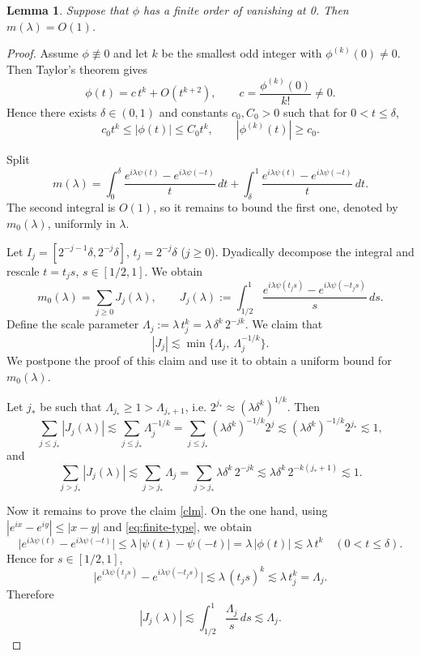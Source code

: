 \documentclass[11pt]{amsart}
\newtheorem{lemma}[theorem]{Lemma}
\newcommand{\la}{\lambda}
\newcommand{\ls}{\lesssim}
\newcommand{\1}{{\rm 1\hspace*{-0.4ex}%
			\rule{0.1ex}{1.52ex}\hspace*{0.2ex}}}
\numberwithin{equation}{section}
\begin{document}
\begin{lemma}\label{finitetype}
	Suppose that $\phi$ has a finite order of vanishing at 0. Then $m(\la)=O(1)$.
\end{lemma}
\begin{proof}
	Assume $\phi\not\equiv 0$ and let $k$ be the smallest odd integer with $\phi^{(k)}(0)\neq 0$.
	Then Taylor's theorem gives
	\[
	\phi(t)=c\,t^k+O(t^{k+2}),\qquad c=\frac{\phi^{(k)}(0)}{k!}\neq 0.
	\]
	Hence there exists $\delta\in(0,1)$ and constants $c_0,C_0>0$ such that for $0<t\le\delta$,
	\begin{equation}\label{eq:finite-type}
		c_0 t^k\le |\phi(t)|\le C_0 t^k,
		\qquad
		|\phi^{(k)}(t)|\ge c_0.
	\end{equation}
	
	Split
	\[
	m(\lambda)=\int_0^\delta \frac{e^{i\lambda\psi(t)}-e^{i\lambda\psi(-t)}}{t}\,dt
	+\int_\delta^1 \frac{e^{i\lambda\psi(t)}-e^{i\lambda\psi(-t)}}{t}\,dt.
	\]
	The second integral is $O(1)$, so it remains to bound the first one, denoted by $m_0(\la)$, uniformly in $\lambda$.
	
	Let $I_j=[2^{-j-1}\delta,2^{-j}\delta]$, $t_j=2^{-j}\delta$ ($j\ge 0$). Dyadically decompose the integral and
	rescale $t=t_js$, $s\in[1/2,1]$. We obtain
	\[
	m_0(\lambda)=\sum_{j\ge 0} J_j(\lambda),
	\qquad
	J_j(\lambda):=\int_{1/2}^1 \frac{e^{i\lambda\psi(t_js)}-e^{i\lambda\psi(-t_js)}}{s}\,ds.
	\]
	Define the scale parameter $\Lambda_j:=\lambda\,t_j^k=\lambda\,\delta^k\,2^{-jk}.$
We claim that \begin{equation}\label{clm}
	|J_j|\ls \min \{\Lambda_j,\ \Lambda_j^{-1/k}\}.
\end{equation} We postpone the proof of this claim and use it to obtain a uniform bound for $m_0(\lambda)$.

 Let $j_*$ be such that $\Lambda_{j_*}\ge 1>\Lambda_{j_*+1}$, i.e.
$2^{j_*}\approx (\lambda\delta^k)^{1/k}$. Then 
\[
\sum_{j\le j_*}|J_j(\lambda)|
\lesssim \sum_{j\le j_*}\Lambda_j^{-1/k}
=\sum_{j\le j_*}(\lambda\delta^k)^{-1/k}2^{j}
\lesssim (\lambda\delta^k)^{-1/k}2^{j_*}
\lesssim 1,
\]
and
\[
\sum_{j> j_*}|J_j(\lambda)|
\lesssim \sum_{j>j_*}\Lambda_j
=\sum_{j>j_*}\lambda\delta^k\,2^{-jk}
\lesssim \lambda\delta^k\,2^{-k(j_*+1)}
\lesssim 1.
\]

Now it remains to prove the claim \eqref{clm}. On the one hand, using $|e^{ix}-e^{iy}|\le |x-y|$ and \eqref{eq:finite-type}, we obtain
	\[
	\big|e^{i\lambda\psi(t)}-e^{i\lambda\psi(-t)}\big|
	\le \la\,|\psi(t)-\psi(-t)|
	=\la\,|\phi(t)|
	\lesssim \la\,t^k \quad (0<t\le\delta).
	\]
 Hence for $s\in[1/2,1]$,
	\[
	\big|e^{i\lambda\psi(t_js)}-e^{i\lambda\psi(-t_js)}\big|
	\lesssim \la\,(t_js)^k\lesssim \la\,t_j^k=\Lambda_j.
	\]
	Therefore
	\begin{equation}\label{eq:small}
		|J_j(\lambda)|
		\ls \int_{1/2}^1 \frac{\Lambda_j}{s}\,ds
		\lesssim \Lambda_j.
	\end{equation}
	

\end{proof}
\end{document}
